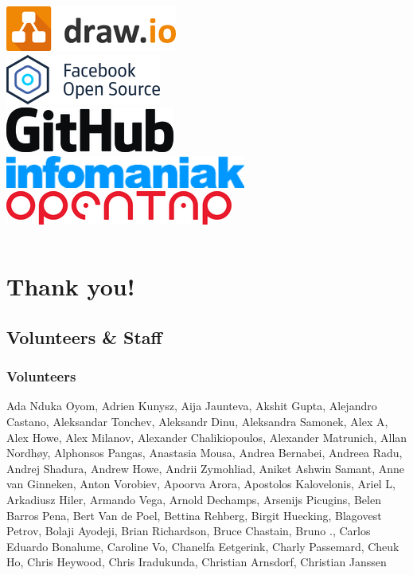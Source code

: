 \documentclass[aspectratio=169]{beamer}
\begin{document}
\begin{frame}
\begin{columns}[t]
		\vspace{0.4cm}
		\includegraphics[scale=0.5]{images/drawio.png}\\
	\centering
		\vspace{0.5cm}
		\includegraphics[scale=0.4]{images/facebook.png}\\
		\vspace{0.5cm}
		\includegraphics[scale=0.5]{images/github.png}\\
		\vspace{0.5cm}
		\includegraphics[scale=0.4]{images/infomaniak.png}
		\vspace{0.5cm}
		\includegraphics[scale=0.4]{images/opentap.png}
	\end{columns}
\end{frame}

\section{Thank you!}

\subsection{Volunteers \& Staff}

\begin{frame}
	\frametitle{Volunteers}
	Ada Nduka Oyom, Adrien Kunysz, Aija Jaunteva, Akshit Gupta, Alejandro Castano, Aleksandar Tonchev, Aleksandr Dinu, Aleksandra Samonek, Alex A, Alex Howe, Alex Milanov, Alexander Chalikiopoulos, Alexander Matrunich, Allan Nordhøy, Alphonsos Pangas, Anastasia Mousa, Andrea Bernabei, Andreea Radu, Andrej Shadura, Andrew Howe, Andrii Zymohliad, Aniket Ashwin Samant, Anne van Ginneken, Anton Vorobiev, Apoorva Arora, Apostolos Kalovelonis, Ariel L, Arkadiusz Hiler, Armando Vega, Arnold Dechamps, Arsenijs Picugins, Belen Barros Pena, Bert Van de Poel, Bettina Rehberg, Birgit Huecking, Blagovest Petrov, Bolaji Ayodeji, Brian Richardson, Bruce Chastain, Bruno ., Carlos Eduardo Bonalume, Caroline Vo, Chanelfa Eetgerink, Charly Passemard, Cheuk Ho, Chris Heywood, Chris Iradukunda, Christian Arnsdorf, Christian Janssen
\end{frame}
\end{document}
